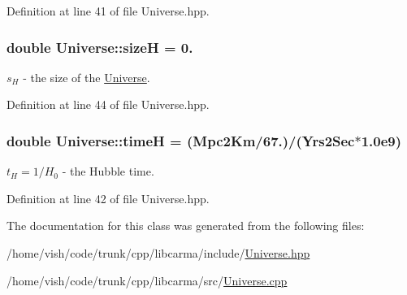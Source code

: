 Definition at line 41 of file Universe.\-hpp.

\hypertarget{class_universe_af2ce871543e110d45306c37c705b0574}{
\subsubsection[{size\-H}]{\setlength{\rightskip}{0pt plus 5cm}double Universe\-::size\-H = 0.}}\label{class_universe_af2ce871543e110d45306c37c705b0574}
$ s_{H}$ -\/ the size of the \hyperlink{class_universe}{Universe}. 

Definition at line 44 of file Universe.\-hpp.

\hypertarget{class_universe_a7a1b9c18475efced2a8260420dfc3911}{
\subsubsection[{time\-H}]{\setlength{\rightskip}{0pt plus 5cm}double Universe\-::time\-H = (Mpc2\-Km/67.)/(Yrs2\-Sec$\ast$1.\-0e9)}}\label{class_universe_a7a1b9c18475efced2a8260420dfc3911}
$t_{H} = 1/H_{0}$ -\/ the Hubble time. 

Definition at line 42 of file Universe.\-hpp.



The documentation for this class was generated from the following files\-:\begin{DoxyCompactItemize}
\item 
/home/vish/code/trunk/cpp/libcarma/include/\hyperlink{_universe_8hpp}{Universe.\-hpp}\item 
/home/vish/code/trunk/cpp/libcarma/src/\hyperlink{_universe_8cpp}{Universe.\-cpp}\end{DoxyCompactItemize}
